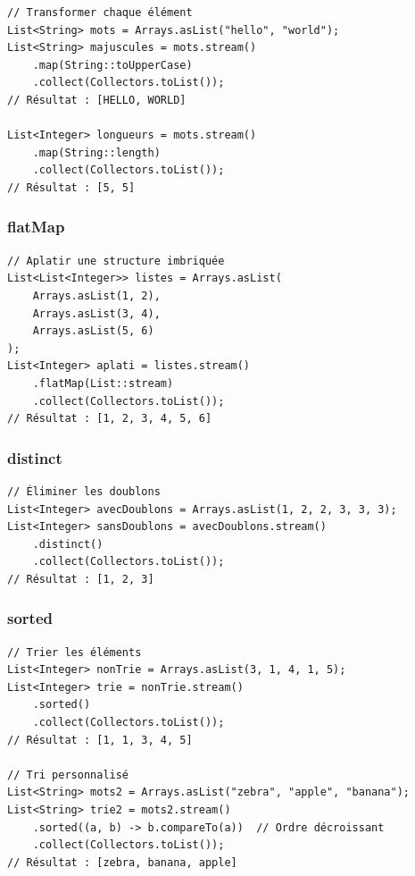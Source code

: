 \documentclass[11pt,a4paper]{article}
\begin{document}
\begin{lstlisting}
// Transformer chaque élément
List<String> mots = Arrays.asList("hello", "world");
List<String> majuscules = mots.stream()
    .map(String::toUpperCase)
    .collect(Collectors.toList());
// Résultat : [HELLO, WORLD]

List<Integer> longueurs = mots.stream()
    .map(String::length)
    .collect(Collectors.toList());
// Résultat : [5, 5]
\end{lstlisting}

\subsubsection{flatMap}

\begin{lstlisting}
// Aplatir une structure imbriquée
List<List<Integer>> listes = Arrays.asList(
    Arrays.asList(1, 2),
    Arrays.asList(3, 4),
    Arrays.asList(5, 6)
);
List<Integer> aplati = listes.stream()
    .flatMap(List::stream)
    .collect(Collectors.toList());
// Résultat : [1, 2, 3, 4, 5, 6]
\end{lstlisting}

\subsubsection{distinct}

\begin{lstlisting}
// Éliminer les doublons
List<Integer> avecDoublons = Arrays.asList(1, 2, 2, 3, 3, 3);
List<Integer> sansDoublons = avecDoublons.stream()
    .distinct()
    .collect(Collectors.toList());
// Résultat : [1, 2, 3]
\end{lstlisting}

\subsubsection{sorted}

\begin{lstlisting}
// Trier les éléments
List<Integer> nonTrie = Arrays.asList(3, 1, 4, 1, 5);
List<Integer> trie = nonTrie.stream()
    .sorted()
    .collect(Collectors.toList());
// Résultat : [1, 1, 3, 4, 5]

// Tri personnalisé
List<String> mots2 = Arrays.asList("zebra", "apple", "banana");
List<String> trie2 = mots2.stream()
    .sorted((a, b) -> b.compareTo(a))  // Ordre décroissant
    .collect(Collectors.toList());
// Résultat : [zebra, banana, apple]
\end{lstlisting}
\end{document}
